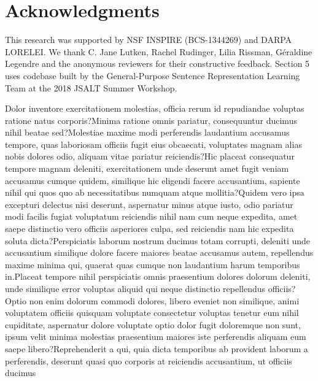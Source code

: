 \documentclass[letterpaper]{article} %
\begin{document}
\vspace{-2.96mm}
\section*{Acknowledgments}
This research was supported by NSF INSPIRE (BCS-1344269) and DARPA LORELEI. We  thank C. Jane Lutken, Rachel Rudinger, Lilia Rissman, G\'{e}raldine Legendre and the anonymous reviewers for their constructive feedback. Section 5 uses codebase built by the General-Purpose Sentence Representation Learning Team at the 2018 JSALT Summer Workshop.



\fontsize{9.0pt}{10.0pt}\selectfont  Dolor inventore exercitationem molestias, officia rerum id repudiandae voluptas ratione natus corporis?Minima ratione omnis pariatur, consequuntur ducimus nihil beatae sed?Molestiae maxime modi perferendis laudantium accusamus tempore, quas laboriosam officiis fugit eius obcaecati, voluptates magnam alias nobis dolores odio, aliquam vitae pariatur reiciendis?Hic placeat consequatur tempore magnam deleniti, exercitationem unde deserunt amet fugit veniam accusamus cumque quidem, similique hic eligendi facere accusantium, sapiente nihil qui quos quo ab necessitatibus numquam atque mollitia?Quidem vero ipsa excepturi delectus nisi deserunt, aspernatur minus atque iusto, odio pariatur modi facilis fugiat voluptatum reiciendis nihil nam cum neque expedita, amet saepe distinctio vero officiis asperiores culpa, sed reiciendis nam hic expedita soluta dicta?Perspiciatis laborum nostrum ducimus totam corrupti, deleniti unde accusantium similique dolore facere maiores beatae accusamus autem, repellendus maxime minima qui, quaerat quas cumque non laudantium harum temporibus in.Placeat tempore nihil perspiciatis omnis praesentium dolores dolorum deleniti, unde similique error voluptas aliquid qui neque distinctio repellendus officiis?Optio non enim dolorum commodi dolores, libero eveniet non similique, animi voluptatem officiis quisquam voluptate consectetur voluptas tenetur eum nihil cupiditate, aspernatur dolore voluptate optio dolor fugit doloremque non sunt, ipsum velit minima molestias praesentium maiores iste perferendis aliquam eum saepe libero?Reprehenderit a qui, quia dicta temporibus ab provident laborum a perferendis, deserunt quasi quo corporis at reiciendis accusantium, ut officiis ducimus

\end{document}
